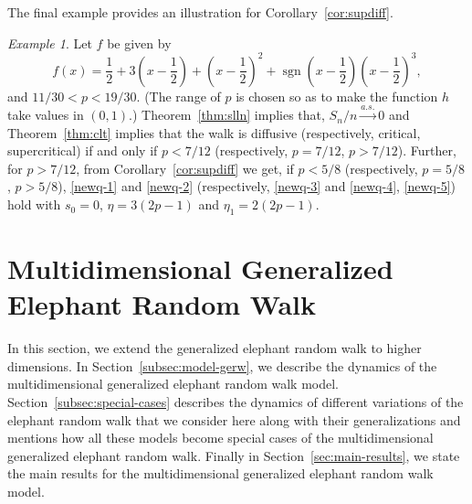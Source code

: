 \documentclass[12pt]{amsart}
\theoremstyle{plain}
\theoremstyle{remark}
\newtheorem{example}{Example}[subsection]
\numberwithin{equation}{section}
\begin{document}
{The final example provides an illustration for Corollary~\ref{cor:supdiff}}.

\begin{example}%
   {Let $f$ be given by
   \[
       f(x) = \frac{1}{2}+3\left(x-\frac{1}{2}\right) +\left(x-\frac{1}{2}\right)^{2}+\operatorname{sgn}\left(x-\frac{1}{2}\right)\left(x-\frac{1}{2}\right)^3,
   \]
   and $11/30 < p < 19 /30$. (The range of $p$ is chosen so as to make the function $h$ take values in $(0,1)$.) Theorem~\ref{thm:slln} implies that, ${S_n}/{n} \stackrel{a.s.}{\to} 0$ and 
    Theorem~\ref{thm:clt} implies that the walk is diffusive (respectively, critical, supercritical) if and only if $p < 7/12$ (respectively, $p = 7/12$, $p > 7/12$). Further, for $p > 7/12$, from Corollary~\ref{cor:supdiff} we get, if $p < {5}/{8}$ (respectively, $p = {5}/{8}$, $p > {5}/{8}$),  \eqref{newq-1} and \eqref{newq-2} (respectively, \eqref{newq-3} and \eqref{newq-4}, \eqref{newq-5}) hold with $s_0 = 0$, $\eta = 3(2p-1)$ and $\eta_1 = 2(2p-1)$.
   }
\end{example}

\section{Multidimensional Generalized Elephant Random Walk}\label{sec:gerw}

In this section, we extend the generalized elephant random walk to higher dimensions. In Section~\ref{subsec:model-gerw}, we describe the dynamics of the multidimensional generalized elephant random walk model. Section~\ref{subsec:special-cases} describes the dynamics of different variations of the elephant random walk that we consider here along with their generalizations and mentions how all these models become special cases of the multidimensional generalized elephant random walk. Finally in Section~\ref{sec:main-results}, we state the main results for the multidimensional generalized elephant random walk model. 
\end{document}
